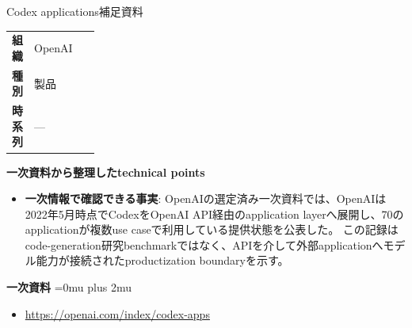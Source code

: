 \begin{technicalnote}{Codex applications}{補足資料}
\begingroup
\begin{tabularx}{\linewidth}{@{}>{\bfseries}p{0.22\linewidth}X@{}}
組織 & OpenAI \\
種別 & 製品 \\
時系列 & — \\
\end{tabularx}
\smallskip
{\bfseries 一次資料から整理したtechnical points}
\begin{itemize}[leftmargin=1.5em,itemsep=0.35em]
\item \textbf{一次情報で確認できる事実}: OpenAIの選定済み一次資料では、OpenAIは2022年5月時点でCodexをOpenAI API経由のapplication layerへ展開し、70のapplicationが複数use caseで利用している提供状態を公表した。 この記録はcode-generation研究benchmarkではなく、APIを介して外部applicationへモデル能力が接続されたproductization boundaryを示す。
\end{itemize}
\begin{minipage}{\linewidth}
\begin{samepage}
{\bfseries 一次資料}
\begingroup\sloppy
\Urlmuskip=0mu plus 2mu\relax
\begin{itemize}[leftmargin=1.5em,itemsep=0.25em]
\item {\scriptsize\url{https://openai.com/index/codex-apps}}
\end{itemize}
\endgroup
\end{samepage}
\end{minipage}
\endgroup
\end{technicalnote}
\medskip

